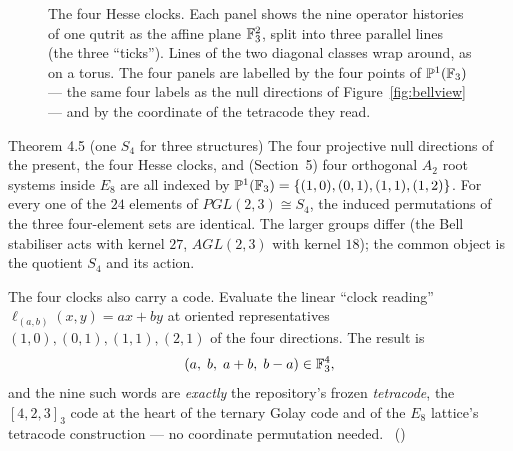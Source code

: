 \begin{figure}[htbp]
\caption{The four Hesse clocks. Each panel shows the nine operator histories of one
qutrit as the affine plane $\mathbb{F}_3^2$, split into three parallel lines (the three ``ticks'').
Lines of the two diagonal classes wrap around, as on a torus. The four panels are labelled
by the four points of $\mathbb{P}^1(\mathbb{F}_3)$ --- the same four labels as the null
directions of Figure~\ref{fig:bellview} --- and by the coordinate of the tetracode they
read.}
\label{fig:hesse}
\end{figure}

\begin{result}{Theorem 4.5 (one $S_4$ for three structures) \hfill \tierC}
The four projective null directions of the present, the four Hesse clocks, and (Section~5)
four orthogonal $A_2$ root systems inside $E_8$ are all indexed by
$\mathbb{P}^1(\mathbb{F}_3)=\{(1,0),(0,1),(1,1),(1,2)\}$. For every one of the $24$ elements of
$PGL(2,3)\cong S_4$, the induced permutations of the three four-element sets are
identical. The larger groups differ (the Bell stabiliser acts with kernel $27$, $AGL(2,3)$
with kernel $18$); the common object is the quotient $S_4$ and its action.
\end{result}

The four clocks also carry a code. Evaluate the linear ``clock reading''
$\ell_{(a,b)}(x,y)=ax+by$ at oriented representatives $(1,0),(0,1),(1,1),(2,1)$ of the four
directions. The result is
\[
(a,\;b,\;a+b,\;b-a)\in\mathbb{F}_3^4 ,
\]
and the nine such words are \emph{exactly} the repository's frozen \emph{tetracode}, the
$[4,2,3]_3$ code at the heart of the ternary Golay code and of the $E_8$ lattice's
tetracode construction --- no coordinate permutation needed. \tierC\
()

